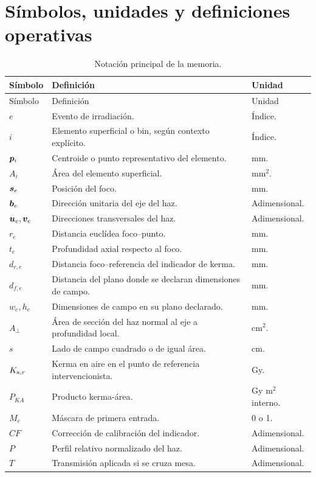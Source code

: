 \chapter{Símbolos, unidades y definiciones operativas}
\begin{longtable}{p{27mm}p{80mm}p{29mm}}
\caption{Notación principal de la memoria.}\\
\toprule Símbolo & Definición & Unidad\\\midrule\endfirsthead
\toprule Símbolo & Definición & Unidad\\\midrule\endhead
\bottomrule\endfoot
$e$ & Evento de irradiación. & Índice.\\
$i$ & Elemento superficial o bin, según contexto explícito. & Índice.\\
$\bm{p}_i$ & Centroide o punto representativo del elemento. & mm.\\
$A_i$ & Área del elemento superficial. & mm$^2$.\\
$\bm{s}_e$ & Posición del foco. & mm.\\
$\bm{b}_e$ & Dirección unitaria del eje del haz. & Adimensional.\\
$\bm{u}_e,\bm{v}_e$ & Direcciones transversales del haz. & Adimensional.\\
$r_e$ & Distancia euclídea foco--punto. & mm.\\
$t_e$ & Profundidad axial respecto al foco. & mm.\\
$d_{r,e}$ & Distancia foco--referencia del indicador de kerma. & mm.\\
$d_{f,e}$ & Distancia del plano donde se declaran dimensiones de campo. & mm.\\
$w_e,h_e$ & Dimensiones de campo en su plano declarado. & mm.\\
$A_\perp$ & Área de sección del haz normal al eje a profundidad local. & cm$^2$.\\
$s$ & Lado de campo cuadrado o de igual área. & cm.\\
$K_{\mathrm{a},r}$ & Kerma en aire en el punto de referencia intervencionista. & Gy.\\
$P_{KA}$ & Producto kerma-área. & Gy m$^2$ interno.\\
$M_e$ & Máscara de primera entrada. & 0 o 1.\\
$CF$ & Corrección de calibración del indicador. & Adimensional.\\
$P$ & Perfil relativo normalizado del haz. & Adimensional.\\
$T$ & Transmisión aplicada si se cruza mesa. & Adimensional.\\

\end{longtable}

